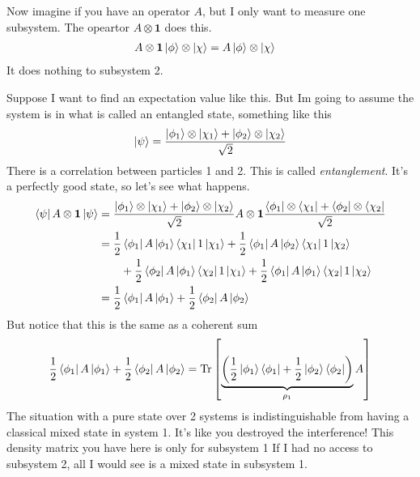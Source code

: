 Now imagine if you have an operator $A$,
but I only want to measure one subsystem.
The opeartor $A\otimes \mathbf{1}$ does this.
\begin{align}
    A\otimes \mathbf{1} \ket{\phi}\otimes\ket{\chi}
    &=
    A \ket{\phi} \otimes \ket{\chi}
\end{align}
It does nothing to subsystem 2.

Suppose I want to find an expectation value like this.
But Im going to assume the system is in what is called an entangled state,
something like this
\begin{align}
    \ket{\psi} =
    \frac{%
        \ket{\phi_1}\otimes\ket{\chi_1}
        + \ket{\phi_2}\otimes\ket{\chi_2}
    }{\sqrt{2}}
\end{align}
There is a correlation between particles 1 and 2.
This is called \emph{entanglement}.
It's a perfectly good state,
so let's see what happens.
\begin{align}
    \bra{\psi} A\otimes\mathbf{1} \ket{\psi} &=
    \frac{%
        \ket{\phi_1}\otimes\ket{\chi_1}
        + \ket{\phi_2}\otimes\ket{\chi_2}
    }{\sqrt{2}}
    A\otimes\mathbf{1}
    \frac{%
        \bra{\phi_1}\otimes\bra{\chi_1}
        + \bra{\phi_2}\otimes\bra{\chi_2}
    }{\sqrt{2}}\\
    &=
    \frac{1}{2}
    \bra{\phi_1}A\ket{\phi_1}
    \bra{\chi_1}1\ket{\chi_1}
    +
    \frac{1}{2}
    \bra{\phi_1}A\ket{\phi_2}
    \bra{\chi_1}1\ket{\chi_2}\\\nonumber
    &\qquad+
    \frac{1}{2}
    \bra{\phi_2}A\ket{\phi_1}
    \bra{\chi_2}1\ket{\chi_1}
    +
    \frac{1}{2}
    \bra{\phi_1}A\ket{\phi_1}
    \bra{\chi_2}1\ket{\chi_2}\\
    &=
    \frac{1}{2}\bra{\phi_1}A\ket{\phi_1}
    + \frac{1}{2}\bra{\phi_2}A\ket{\phi_2}
\end{align}
But notice that this is the same as a coherent sum
\begin{align}
    \frac{1}{2}\bra{\phi_1}A\ket{\phi_1}
    + \frac{1}{2}\bra{\phi_2}A\ket{\phi_2}
    =\Tr\left[
        \underbrace{\left(
            \frac{1}{2}\ket{\phi_1}\bra{\phi_1}
            + \frac{1}{2}\ket{\phi_2}\bra{\phi_2}
        \right)}_{\rho_1} A
    \right]
\end{align}
The situation with a pure state over 2 systems is indistinguishable from having
a classical mixed state in system 1.
It's like you destroyed the interference!
This density matrix you have here is only for subsystem 1
If I had no access to subsystem 2,
all I would see is a mixed state in subsystem 1.
